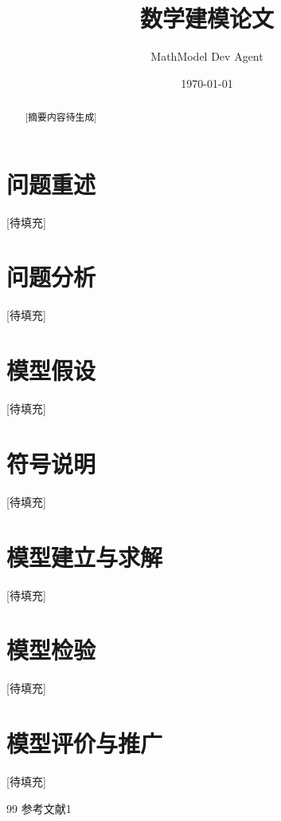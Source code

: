 \documentclass[12pt,a4paper]{article}
\title{数学建模论文}
\author{MathModel Dev Agent}
\date{\today}
\begin{document}
\maketitle

\begin{abstract}
[摘要内容待生成]
\end{abstract}

\section{问题重述}
[待填充]

\section{问题分析}
[待填充]

\section{模型假设}
[待填充]

\section{符号说明}
[待填充]

\section{模型建立与求解}
[待填充]

\section{模型检验}
[待填充]

\section{模型评价与推广}
[待填充]

\begin{thebibliography}{99}
 参考文献1
\end{thebibliography}
\end{document}
